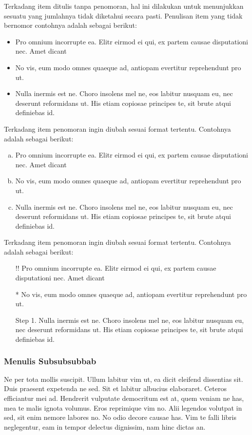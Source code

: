 Terkadang item ditulis tanpa penomoran, hal ini dilakukan untuk menunjukkan sesuatu yang jumlahnya tidak diketahui secara pasti. Penulisan item yang tidak bernomor contohnya adalah sebagai berikut:
\begin{itemize}
    \item Pro omnium incorrupte ea. Elitr eirmod ei qui, ex partem causae disputationi nec. Amet dicant
    \item No vis, eum modo omnes quaeque ad, antiopam evertitur reprehendunt pro ut.
    \item Nulla inermis est ne. Choro insolens mel ne, eos labitur nusquam eu, nec deserunt reformidans ut. His etiam copiosae principes te, sit brute atqui definiebas id.
\end{itemize}

Terkadang item penomoran ingin diubah sesuai format tertentu. Contohnya adalah sebagai berikut:
\begin{enumerate}[a).]
    \item Pro omnium incorrupte ea. Elitr eirmod ei qui, ex partem causae disputationi nec. Amet dicant
    \item No vis, eum modo omnes quaeque ad, antiopam evertitur reprehendunt pro ut.
    \item Nulla inermis est ne. Choro insolens mel ne, eos labitur nusquam eu, nec deserunt reformidans ut. His etiam copiosae principes te, sit brute atqui definiebas id.
\end{enumerate}

Terkadang item penomoran ingin diubah sesuai format tertentu. Contohnya adalah sebagai berikut:
\begin{itemize}
    \item[!!] Pro omnium incorrupte ea. Elitr eirmod ei qui, ex partem causae disputationi nec. Amet dicant
    \item[*] No vis, eum modo omnes quaeque ad, antiopam evertitur reprehendunt pro ut.
    \item[Step 1.] Nulla inermis est ne. Choro insolens mel ne, eos labitur nusquam eu, nec deserunt reformidans ut. His etiam copiosae principes te, sit brute atqui definiebas id.
\end{itemize}


\subsubsection{Menulis Subsubsubbab}
Ne per tota mollis suscipit. Ullum labitur vim ut, ea dicit eleifend dissentias sit. Duis praesent expetenda ne sed. Sit et labitur albucius elaboraret. Ceteros efficiantur mei ad. Hendrerit vulputate democritum est at, quem veniam ne has, mea te malis ignota volumus. Eros reprimique vim no. Alii legendos volutpat in sed, sit enim nemore labores no. No odio decore causae has. Vim te falli libris neglegentur, eam in tempor delectus dignissim, nam hinc dictas an.

